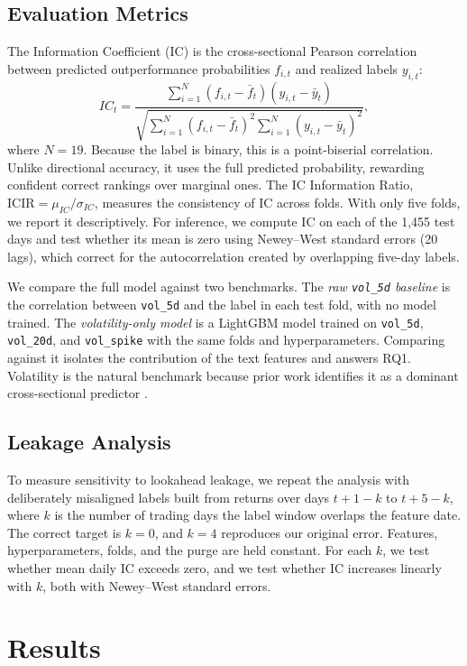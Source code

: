 \documentclass[10pt,letterpaper,twocolumn]{article}
\begin{document}
\subsection{Evaluation Metrics}
The Information Coefficient (IC) is the cross-sectional Pearson correlation between predicted outperformance probabilities $f_{i,t}$ and realized labels $y_{i,t}$:
\[
IC_t=\frac{\sum_{i=1}^{N}(f_{i,t}-\bar f _t)(y_{i,t} - \bar y_t)}
{\sqrt{\sum_{i=1}^{N}(f_{i,t}-\bar f _t)^2 \sum_{i=1}^{N}(y_{i,t} - \bar y_t)^2}},
\]
where $N = 19$. Because the label is binary, this is a point-biserial correlation. Unlike directional accuracy, it uses the full predicted probability, rewarding confident correct rankings over marginal ones. The IC Information Ratio, $\text{ICIR} = \mu_{IC} / \sigma_{IC}$, measures the consistency of IC across folds. With only five folds, we report it descriptively. For inference, we compute IC on each of the 1,455 test days and test whether its mean is zero using Newey--West standard errors (20 lags), which correct for the autocorrelation created by overlapping five-day labels.

We compare the full model against two benchmarks. The \emph{raw \texttt{vol\_5d} baseline} is the correlation between \texttt{vol\_5d} and the label in each test fold, with no model trained. The \emph{volatility-only model} is a LightGBM model trained on \texttt{vol\_5d}, \texttt{vol\_20d}, and \texttt{vol\_spike} with the same folds and hyperparameters. Comparing against it isolates the contribution of the text features and answers RQ1. Volatility is the natural benchmark because prior work identifies it as a dominant cross-sectional predictor \cite{10.1093/rfs/hhaa009}.

\subsection{Leakage Analysis}
To measure sensitivity to lookahead leakage, we repeat the analysis with deliberately misaligned labels built from returns over days $t+1-k$ to $t+5-k$, where $k$ is the number of trading days the label window overlaps the feature date. The correct target is $k = 0$, and $k = 4$ reproduces our original error. Features, hyperparameters, folds, and the purge are held constant. For each $k$, we test whether mean daily IC exceeds zero, and we test whether IC increases linearly with $k$, both with Newey--West standard errors.

\section{Results}
\end{document}
